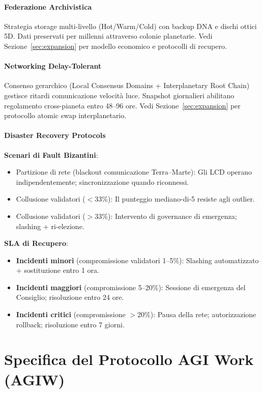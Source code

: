 \documentclass[11pt]{article}
\begin{document}
\begin{itemize}[noitemsep]
\paragraph{Federazione Archivistica}
Strategia storage multi-livello (Hot/Warm/Cold) con backup DNA e dischi ottici 5D. Dati preservati per millenni attraverso colonie planetarie. Vedi Sezione~\ref{sec:expansion} per modello economico e protocolli di recupero.

\paragraph{Networking Delay-Tolerant}
Consenso gerarchico (Local Consensus Domains + Interplanetary Root Chain) gestisce ritardi comunicazione velocità luce. Snapshot giornalieri abilitano regolamento cross-pianeta entro 48--96 ore. Vedi Sezione~\ref{sec:expansion} per protocollo atomic swap interplanetario.

\paragraph{Disaster Recovery Protocols}
\textbf{Scenari di Fault Bizantini}:
\begin{itemize}[noitemsep]
  \item Partizione di rete (blackout comunicazione Terra--Marte): Gli LCD operano indipendentemente; sincronizzazione quando riconnessi.
  \item Collusione validatori ($<$33\%): Il punteggio mediano-di-5 resiste agli outlier.
  \item Collusione validatori ($>$33\%): Intervento di governance di emergenza; slashing + ri-elezione.
\end{itemize}

\textbf{SLA di Recupero}:
\begin{itemize}[noitemsep]
  \item \textbf{Incidenti minori} (compromissione validatori 1--5\%): Slashing automatizzato + sostituzione entro 1 ora.
  \item \textbf{Incidenti maggiori} (compromissione 5--20\%): Sessione di emergenza del Consiglio; risoluzione entro 24 ore.
  \item \textbf{Incidenti critici} (compromissione $>$20\%): Pausa della rete; autorizzazione rollback; risoluzione entro 7 giorni.
\end{itemize}

\section{Specifica del Protocollo AGI Work (AGIW)}
\label{sec:agiw-spec}


\end{itemize}
\end{document}
